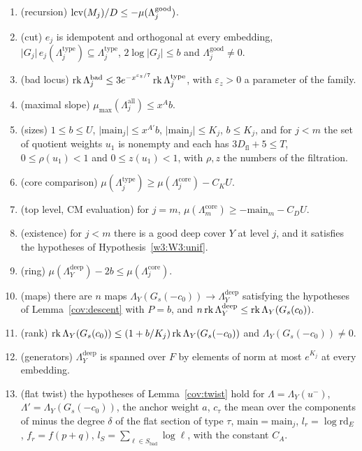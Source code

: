 \begin{enumerate}
\item[(I1)] (recursion) $\operatorname{lcv}(M_j)/D\le-\mu(\Lambda^{\mathrm{good}}_j)$.
\item[(I2)] (cut) $e_j$ is idempotent and orthogonal at every embedding, $\lvert G_j\rvert\,e_j(\Lambda^{\mathrm{type}}_j)\subseteq\Lambda^{\mathrm{type}}_j$, $2\log\lvert G_j\rvert\le b$ and $\Lambda^{\mathrm{good}}_j\ne0$.
\item[(I3)] (bad locus) $\operatorname{rk}\Lambda^{\mathrm{bad}}_j\le3e^{-x^{\varepsilon_z/7}}\operatorname{rk}\Lambda^{\mathrm{type}}_j$, with $\varepsilon_z>0$ a parameter of the family.
\item[(I4)] (maximal slope) $\mu_{\max}(\Lambda^{\mathrm{all}}_j)\le x^Ab$.
\item[(I5)] (sizes) $1\le b\le U$, $\lvert\mathrm{main}_j\rvert\le x^{A'}b$, $\lvert\mathrm{main}_j\rvert\le K_j$, $b\le K_j$, and for $j<m$ the set of quotient weights $u_1$ is nonempty and each has $3D_{\mathrm{fl}}+5\le T$, $0\le\rho(u_1)<1$ and $0\le z(u_1)<1$, with $\rho,z$ the numbers of the filtration.
\item[(I6)] (core comparison) $\mu(\Lambda^{\mathrm{type}}_j)\ge\mu(\Lambda^{\mathrm{core}}_j)-C_KU$.
\item[(I7)] (top level, CM evaluation) for $j=m$, $\mu(\Lambda^{\mathrm{core}}_m)\ge-\mathrm{main}_m-C_DU$.
\item[(I8)] (existence) for $j<m$ there is a good deep cover $Y$ at level $j$, and it satisfies the hypotheses of Hypothesis~\ref{w3:W3:unif}.
\item[(I9)] (ring) $\mu(\Lambda^{\mathrm{deep}}_Y)-2b\le\mu(\Lambda^{\mathrm{core}}_j)$.
\item[(I10)] (maps) there are $n$ maps $\Lambda_Y(G_s(-c_0))\to\Lambda^{\mathrm{deep}}_Y$ satisfying the hypotheses of Lemma~\ref{cov:descent} with $P=b$, and $n\operatorname{rk}\Lambda^{\mathrm{deep}}_Y\le\operatorname{rk}\Lambda_Y(G_s(c_0))$.
\item[(I11)] (rank) $\operatorname{rk}\Lambda_Y(G_s(c_0))\le(1+b/K_j)\operatorname{rk}\Lambda_Y(G_s(-c_0))$ and $\Lambda_Y(G_s(-c_0))\ne0$.
\item[(I12)] (generators) $\Lambda^{\mathrm{deep}}_Y$ is spanned over $F$ by elements of norm at most $e^{K_j}$ at every embedding.
\item[(I13)] (flat twist) the hypotheses of Lemma~\ref{cov:twist} hold for $\Lambda=\Lambda_Y(u^-)$, $\Lambda'=\Lambda_Y(G_s(-c_0))$, the anchor weight $a$, $c_\tau$ the mean over the components of minus the degree $\delta$ of the flat section of type $\tau$, $\mathrm{main}=\mathrm{main}_j$, $l_r=\log\mathrm{rd}_E$, $f_r=f(p+q)$, $l_S=\sum_{\ell\in S_{\mathrm{bad}}}\log\ell$, with the constant $C_A$.

\end{enumerate}

